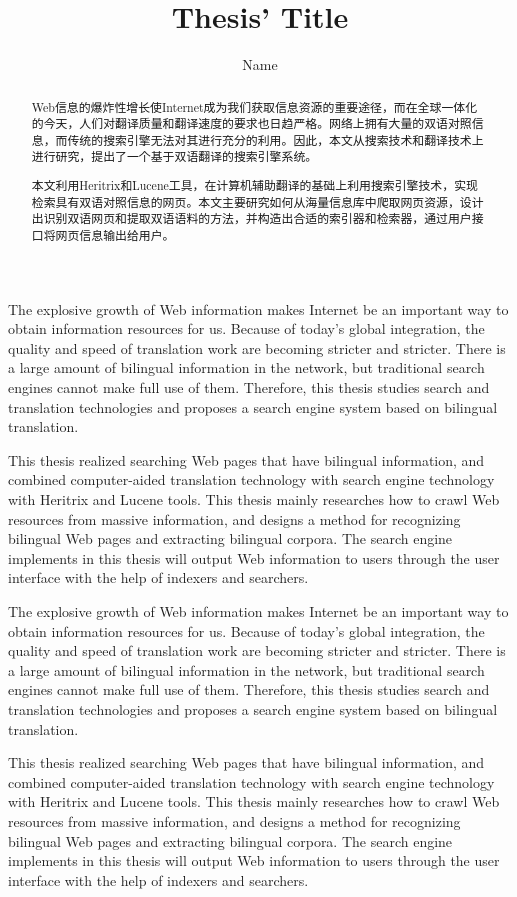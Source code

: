 \documentclass{swjtuthesis}
\begin{document}
\title{Thesis' Title}
\author{Name}
\maketitlepage

\makeais
\makecua
\makeevaluatepage

\startabstract
{}
\begin{abstract}
    Web信息的爆炸性增长使Internet成为我们获取信息资源的重要途径，而在全球一体化的今天，人们对翻译质量和翻译速度的要求也日趋严格。网络上拥有大量的双语对照信息，而传统的搜索引擎无法对其进行充分的利用。因此，本文从搜索技术和翻译技术上进行研究，提出了一个基于双语翻译的搜索引擎系统。

    本文利用Heritrix和Lucene工具，在计算机辅助翻译的基础上利用搜索引擎技术，实现检索具有双语对照信息的网页。本文主要研究如何从海量信息库中爬取网页资源，设计出识别双语网页和提取双语语料的方法，并构造出合适的索引器和检索器，通过用户接口将网页信息输出给用户。   
\end{abstract}
\begin{enabstract}
    The explosive growth of Web information makes Internet be an important way to obtain information resources for us. Because of today’s global integration, the quality and speed of translation work are becoming stricter and stricter. There is a large amount of bilingual information in the network, but traditional search engines cannot make full use of them. Therefore, this thesis studies search and translation technologies and proposes a search engine system based on bilingual translation.

    This thesis realized searching Web pages that have bilingual information, and combined computer-aided translation technology with search engine technology with Heritrix and Lucene tools. This thesis mainly researches how to crawl Web resources from massive information, and designs a method for recognizing bilingual Web pages and extracting bilingual corpora. The search engine implements in this thesis will output Web information to users through the user interface with the help of indexers and searchers.

    The explosive growth of Web information makes Internet be an important way to obtain information resources for us. Because of today’s global integration, the quality and speed of translation work are becoming stricter and stricter. There is a large amount of bilingual information in the network, but traditional search engines cannot make full use of them. Therefore, this thesis studies search and translation technologies and proposes a search engine system based on bilingual translation.

    This thesis realized searching Web pages that have bilingual information, and combined computer-aided translation technology with search engine technology with Heritrix and Lucene tools. This thesis mainly researches how to crawl Web resources from massive information, and designs a method for recognizing bilingual Web pages and extracting bilingual corpora. The search engine implements in this thesis will output Web information to users through the user interface with the help of indexers and searchers.
\end{enabstract}
\end{document}
